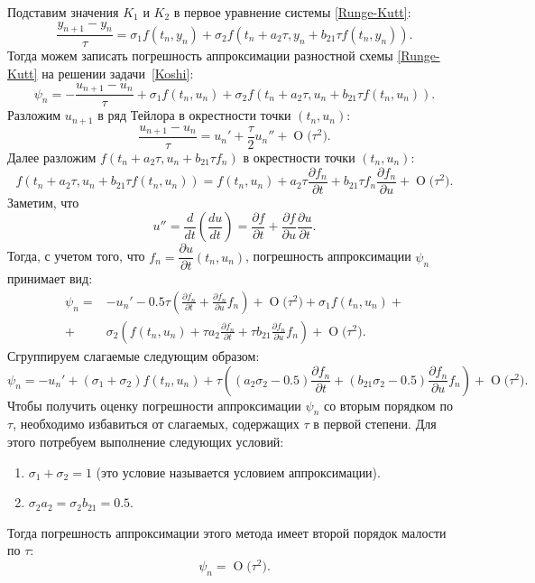 \documentclass[11pt,a4paper,twoside]{report}
\numberwithin{equation}{section}
\theoremstyle{definition}
\theoremstyle{plain}
\newcommand{\bigO}[1]{\ensuremath{\operatorname{O}\bigl(#1\bigr)}}
\begin{document}
Подставим значения $K_1$ и $K_2$ в первое уравнение системы \eqref{Runge-Kutt}:
%
$$
    \frac{y_{n+1} - y_n}{\tau} = \sigma_1 f(t_n, y_n) +
    \sigma_2 f(t_n + a_2 \tau, y_n + b_{21} \tau f(t_n, y_n)).
$$
%
Тогда можем записать погрешность аппроксимации разностной схемы \eqref{Runge-Kutt}
на решении задачи~\eqref{Koshi}:
%
\begin{equation}
%
    \label{Runge-Kutt_appr}
    \psi_n = - \frac{u_{n+1} - u_n}{\tau} + \sigma_1 f(t_n, u_n) +
    \sigma_2 f\left(t_n+a_2\tau, u_n + b_{21}\tau f(t_n, u_n)\right).
%
\end{equation}
%
Разложим $u_{n+1}$ в ряд Тейлора в окрестности точки $(t_n, u_n)$:
%
$$
    \frac{u_{n+1} - u_n}{\tau} = u_n' + \frac{\tau}2 u_n'' + \bigO{\tau^2}.
$$
%
Далее разложим $f(t_n + a_2\tau, u_n + b_{21} \tau f_n)$ в окрестности точки $(t_n, u_n)$:
%
$$
    f(t_n + a_2\tau, u_n + b_{21} \tau f(t_n, u_n)) = f(t_n, u_n) +
    a_2\tau \frac{\partial f_n}{\partial t} +
    b_{21}\tau f_n \frac{\partial f_n}{\partial u} + \bigO{\tau^2}.
$$
%
Заметим, что
%
$$
    u'' = \dfrac{d}{dt}\left(\frac{du}{dt}\right) =
    \dfrac{\partial f}{\partial t} + \dfrac{\partial f}{\partial u}\dfrac{\partial u}{\partial t}.
$$
%
Тогда, с учетом того, что $f_n = \dfrac{\partial u}{\partial t}(t_n, u_n)$,
погрешность аппроксимации $\psi_n$ принимает вид:
%
\begin{equation*}
%
    \begin{split}
    \psi_n =& -u_n' - 0.5\tau\left(\frac{\partial f_n}{\partial t} +
    \frac{\partial f_n}{\partial u}f_n\right) + \bigO{\tau^2} + \sigma_1 f(t_n, u_n) + \\
    +& \sigma_2 \left(f(t_n, u_n) + \tau a_2 \frac{\partial f_n}{\partial t} +
    \tau b_{21} \frac{\partial f_n}{\partial u}f_n\right) + \bigO{\tau^2}.
    \end{split}
%
\end{equation*}
%
Сгруппируем слагаемые следующим образом:
%
$$
    \psi_n = -u_n' +(\sigma_1 + \sigma_2)f(t_n, u_n) +
    \tau\left((a_2\sigma_2 - 0.5)\frac{\partial f_n}{\partial t} +
    (b_{21}\sigma_2 - 0.5)\frac{\partial f_n}{\partial u}f_n\right) + \bigO{\tau^2}.
$$
%
Чтобы получить оценку погрешности аппроксимации $\psi_n$ со вторым порядком по $\tau$,
необходимо избавиться от слагаемых, содержащих $\tau$ в первой степени.
Для этого потребуем выполнение следующих условий:
%
\begin{enumerate}
%
    \item
        $\sigma_1 + \sigma_2 = 1$ (это условие называется условием аппроксимации).
    \item
        $\sigma_2 a_2 = \sigma_2 b_{21} = 0.5$.
%
\end{enumerate}
%
Тогда погрешность аппроксимации этого метода имеет второй порядок малости по $\tau$:
%
$$
    \psi_n = \bigO{\tau^2}.
$$
\end{document}
